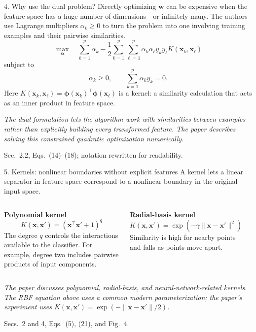 \documentclass[10pt,compress]{beamer}
\newcommand{\norm}[1]{\lVert #1\rVert}
\newcommand{\x}{\bm{x}}
\newcommand{\w}{\bm{w}}
\newcommand{\phiX}{\bm{\phi}}
\newcommand{\defline}[1]{{\footnotesize\textcolor{aggiemaroon}{\textit{#1}}\par}}
\begin{document}
\begin{frame}{4. Why use the dual problem?}
Directly optimizing $\w$ can be expensive when the feature space has a huge number of dimensions—or infinitely many. The authors use Lagrange multipliers $\alpha_k\geq0$ to turn the problem into one involving training examples and their pairwise similarities.
\[
\max_{\boldsymbol{\alpha}}\quad
\sum_{k=1}^{p}\alpha_k
-\frac12\sum_{k=1}^{p}\sum_{\ell=1}^{p}
\alpha_k\alpha_\ell y_ky_\ell
K(\x_k,\x_\ell)
\]
subject to
\[
\alpha_k\geq0,\qquad \sum_{k=1}^{p}\alpha_k y_k=0.
\]
Here $K(\x_k,\x_\ell)=\phiX(\x_k)^\top\phiX(\x_\ell)$ is a kernel: a similarity calculation that acts as an inner product in feature space.
\defline{The dual formulation lets the algorithm work with similarities between examples rather than explicitly building every transformed feature. The paper describes solving this constrained quadratic optimization numerically.}
{\scriptsize Sec.~2.2, Eqs.~(14)--(18); notation rewritten for readability.}
\end{frame}

\begin{frame}{5. Kernels: nonlinear boundaries without explicit features}
A kernel lets a linear separator in feature space correspond to a nonlinear boundary in the original input space.
\begin{columns}[T]
\textbf{Polynomial kernel}
\[
K(\x,\x')=(\x^\top\x'+1)^q
\]
\small
The degree $q$ controls the interactions available to the classifier. For example, degree two includes pairwise products of input components.
\vspace{2mm}

\textbf{Radial-basis kernel}
\[
K(\x,\x')=\exp(-\gamma\norm{\x-\x'}^2)
\]
\small
Similarity is high for nearby points and falls as points move apart.
\begin{center}
\end{center}
\end{columns}
\defline{The paper discusses polynomial, radial-basis, and neural-network-related kernels. The RBF equation above uses a common modern parameterization; the paper's experiment uses $K(\x,\x')=\exp(-\norm{\x-\x'}/2)$.}
{\scriptsize Secs.~2 and 4, Eqs.~(5), (21), and Fig.~4.}
\end{frame}
\end{document}
